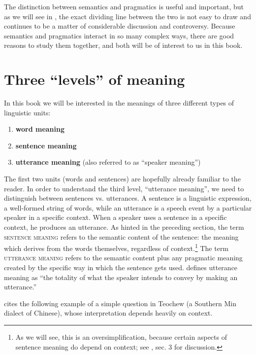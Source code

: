 The distinction between semantics and pragmatics is useful and important, but as we will see in , the exact dividing line between the two is not easy to draw and continues to be a matter of considerable discussion and controversy. Because semantics and pragmatics interact in so many complex ways, there are good reasons to study them together, and both will be of interest to us in this book.


\section{Three “levels” of meaning}\label{sec:} %

In this book we will be interested in the meanings of three different types of linguistic units:


\begin{enumerate}
\item \bfseries
word meaning
\item \bfseries
sentence meaning
\item \textbf{utterance meaning} (also referred to as “speaker meaning”)
\end{enumerate}

The first two units (words and sentences) are hopefully already familiar to the reader. In order to understand the third level, “utterance meaning”, we need to distinguish between sentences vs. utterances. A sentence is a linguistic expression, a well-formed string of words, while an utterance is a speech event by a particular speaker in a specific context. When a speaker uses a sentence in a specific context, he produces an utterance. As hinted in the preceding section, the term \textsc{sentence meaning} refers to the semantic content of the sentence: the meaning which derives from the words themselves, regardless of context.\footnote{As we will see, this is an oversimplification, because certain aspects of sentence meaning do depend on context; see , sec. 3 for discussion.} The term \textsc{utterance} \textsc{meaning} refers to the semantic content plus any pragmatic meaning created by the specific way in which the sentence gets used. \citet[27]{Cruse2000} defines utterance meaning as “the totality of what the speaker intends to convey by making an utterance.”



\citet[1]{Kroeger2005} cites the following example of a simple question in Teochew (a Southern Min dialect of Chinese), whose interpretation depends heavily on context.


